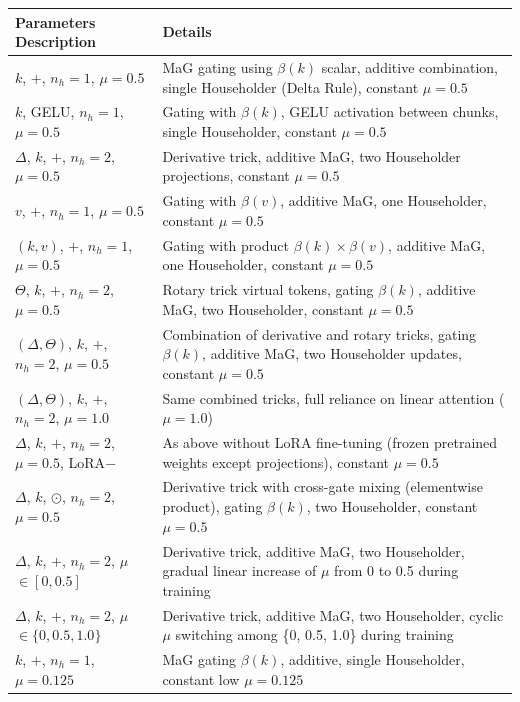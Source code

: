 \documentclass[10pt,a4paper]{article}
\begin{document}
\begin{table}[ht]
\centering
\renewcommand{\arraystretch}{1.3}
\begin{tabular}{|l|p{11cm}|}
\hline
\textbf{Parameters Description} & \textbf{Details} \\
\hline
$k$, $+$, $n_h=1$, $\mu=0.5$ & MaG gating using \(\beta(k)\) scalar, additive combination, single Householder (Delta Rule), constant \(\mu=0.5\) \\
$k$, GELU, $n_h=1$, $\mu=0.5$ & Gating with \(\beta(k)\), GELU activation between chunks, single Householder, constant \(\mu=0.5\) \\
$\Delta$, $k$, $+$, $n_h=2$, $\mu=0.5$ & Derivative trick, additive MaG, two Householder projections, constant \(\mu=0.5\) \\
$v$, $+$, $n_h=1$, $\mu=0.5$ & Gating with \(\beta(v)\), additive MaG, one Householder, constant \(\mu=0.5\) \\
$(k,v)$, $+$, $n_h=1$, $\mu=0.5$ & Gating with product \(\beta(k) \times \beta(v)\), additive MaG, one Householder, constant \(\mu=0.5\) \\
$\Theta$, $k$, $+$, $n_h=2$, $\mu=0.5$ & Rotary trick virtual tokens, gating \(\beta(k)\), additive MaG, two Householder, constant \(\mu=0.5\) \\
$(\Delta,\Theta)$, $k$, $+$, $n_h=2$, $\mu=0.5$ & Combination of derivative and rotary tricks, gating \(\beta(k)\), additive MaG, two Householder updates, constant \(\mu=0.5\) \\
$(\Delta,\Theta)$, $k$, $+$, $n_h=2$, $\mu=1.0$ & Same combined tricks, full reliance on linear attention (\(\mu=1.0\)) \\
$\Delta$, $k$, $+$, $n_h=2$, $\mu=0.5$, LoRA$-$ & As above without LoRA fine-tuning (frozen pretrained weights except projections), constant \(\mu=0.5\) \\
$\Delta$, $k$, $\odot$, $n_h=2$, $\mu=0.5$ & Derivative trick with cross-gate mixing (elementwise product), gating \(\beta(k)\), two Householder, constant \(\mu=0.5\) \\
$\Delta$, $k$, $+$, $n_h=2$, $\mu$ $\in [0,0.5]$ & Derivative trick, additive MaG, two Householder, gradual linear increase of \(\mu\) from 0 to 0.5 during training \\
$\Delta$, $k$, $+$, $n_h=2$, $\mu$ $\in \{0, 0.5, 1.0\}$ & Derivative trick, additive MaG, two Householder, cyclic \(\mu\) switching among \{0, 0.5, 1.0\} during training \\
$k$, $+$, $n_h=1$, $\mu=0.125$ & MaG gating \(\beta(k)\), additive, single Householder, constant low \(\mu=0.125\) \\

\end{tabular}
\end{table}
\end{document}
